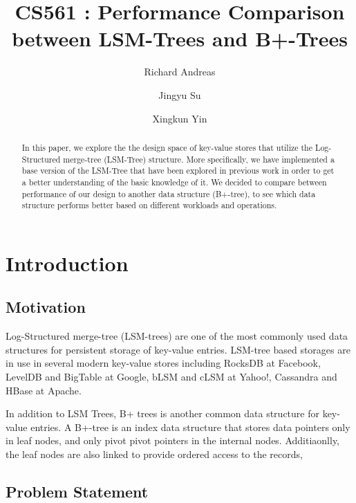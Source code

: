 \documentclass[sigconf]{acmart}
\begin{document}
\title{CS561 : Performance Comparison between LSM-Trees and B+-Trees}

\author{Richard Andreas}
\author{Jingyu Su}
\author{Xingkun Yin}

\begin{abstract}
    In this paper, we explore the the design space of key-value stores that utilize the Log-Structured merge-tree (LSM-Tree) structure. More specifically, we have implemented a base version of the LSM-Tree that have been explored in previous work in order to get a better understanding of the basic knowledge of it. We decided to compare between performance of our design to another data structure (B+-tree), to see which data structure performs better based on different workloads and operations.
\end{abstract}

\maketitle

\section{Introduction}

\subsection{Motivation}


Log-Structured merge-tree (LSM-trees) are one of the most commonly used data structures for persistent storage of key-value entries. LSM-tree based storages are in use in several modern key-value stores including RocksDB at
Facebook, LevelDB and BigTable at Google, bLSM and cLSM at Yahoo!, Cassandra
and HBase at Apache. 

In addition to LSM Trees, B+ trees is another common data structure for key-value entries. A B+-tree is an index data structure that stores data pointers only in leaf nodes, and only pivot pivot pointers in the internal nodes. Additiaonlly, the leaf nodes are also linked to provide ordered access to the records,

\subsection{Problem Statement}
\end{document}
